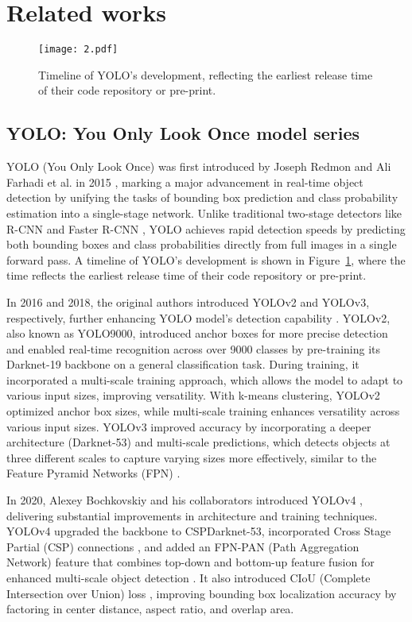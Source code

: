 \documentclass[runningheads]{llncs}
\begin{document}
\section{Related works}

\begin{figure}[H]
\centering
\texttt{[image: 2.pdf]} %
\caption{Timeline of YOLO's development, reflecting the earliest release time of their code repository or pre-print.}
\label{fig:timeline}
\end{figure}

\subsection{YOLO: You Only Look Once model series }
YOLO (You Only Look Once) was first introduced by Joseph Redmon and Ali Farhadi et al. in 2015 \cite{Redmon2016}, marking a major advancement in real-time object detection by unifying the tasks of bounding box prediction and class probability estimation into a single-stage network. Unlike traditional two-stage detectors like R-CNN and Faster R-CNN \cite{Girshick2014, Ren2016}, YOLO achieves rapid detection speeds by predicting both bounding boxes and class probabilities directly from full images in a single forward pass. A timeline of YOLO's development is shown in Figure~\ref{fig:timeline}, where the time reflects the earliest release time of their code repository or pre-print.

In 2016 and 2018, the original authors introduced YOLOv2 and YOLOv3, respectively, further enhancing YOLO model’s detection capability \cite{Redmon2017, Redmon2018}. YOLOv2, also known as YOLO9000, introduced anchor boxes for more precise detection and enabled real-time recognition across over 9000 classes by pre-training its Darknet-19 backbone on a general classification task. During training, it incorporated a multi-scale training approach, which allows the model to adapt to various input sizes, improving versatility. With k-means clustering, YOLOv2 optimized anchor box sizes, while multi-scale training enhances versatility across various input sizes. YOLOv3 improved accuracy by incorporating a deeper architecture (Darknet-53) and multi-scale predictions, which detects objects at three different scales to capture varying sizes more effectively, similar to the Feature Pyramid Networks (FPN) \cite{Lin2017}.

In 2020, Alexey Bochkovskiy and his collaborators introduced YOLOv4 \cite{Bochkovskiy2020}, delivering substantial improvements in architecture and training techniques. YOLOv4 upgraded the backbone to CSPDarknet-53, incorporated Cross Stage Partial (CSP) connections \cite{Wang2020b}, and added an FPN-PAN (Path Aggregation Network) feature that combines top-down and bottom-up feature fusion for enhanced multi-scale object detection \cite{Liu2018}. It also introduced CIoU (Complete Intersection over Union) loss \cite{Zheng2020}, improving bounding box localization accuracy by factoring in center distance, aspect ratio, and overlap area.
\end{document}
